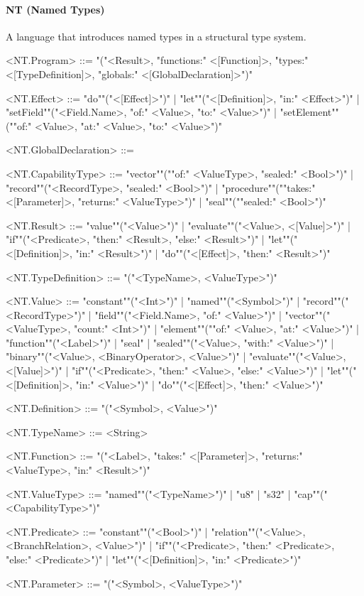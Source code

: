 \documentclass[main.tex]{subfiles}
\begin{document}
\paragraph{ NT (Named Types) } A language that introduces named types in a structural type system.
\begin{grammar}
	\footnotesize
				<NT.Program> ::=
							"("<Result>, "functions:" <[Function]>, "types:" <[TypeDefinition]>, "globals:" <[GlobalDeclaration]>")"
				\par
				<NT.Effect> ::=
						"do""("<[Effect]>")"
						| "let""("<[Definition]>, "in:" <Effect>")"
						| "setField""("<Field.Name>, "of:" <Value>, "to:" <Value>")"
						| "setElement""(""of:" <Value>, "at:" <Value>, "to:" <Value>")"
				\par
				<NT.GlobalDeclaration> ::=
				\par
				<NT.CapabilityType> ::=
						"vector""(""of:" <ValueType>, "sealed:" <Bool>")"
						| "record""("<RecordType>, "sealed:" <Bool>")"
						| "procedure""(""takes:" <[Parameter]>, "returns:" <ValueType>")"
						| "seal""(""sealed:" <Bool>")"
				\par
				<NT.Result> ::=
						"value""("<Value>")"
						| "evaluate""("<Value>, <[Value]>")"
						| "if""("<Predicate>, "then:" <Result>, "else:" <Result>")"
						| "let""("<[Definition]>, "in:" <Result>")"
						| "do""("<[Effect]>, "then:" <Result>")"
				\par
				<NT.TypeDefinition> ::=
							"("<TypeName>, <ValueType>")"
				\par
				<NT.Value> ::=
						"constant""("<Int>")"
						| "named""("<Symbol>")"
						| "record""("<RecordType>")"
						| "field""("<Field.Name>, "of:" <Value>")"
						| "vector""("<ValueType>, "count:" <Int>")"
						| "element""(""of:" <Value>, "at:" <Value>")"
						| "function""("<Label>")"
						| "seal"
						| "sealed""("<Value>, "with:" <Value>")"
						| "binary""("<Value>, <BinaryOperator>, <Value>")"
						| "evaluate""("<Value>, <[Value]>")"
						| "if""("<Predicate>, "then:" <Value>, "else:" <Value>")"
						| "let""("<[Definition]>, "in:" <Value>")"
						| "do""("<[Effect]>, "then:" <Value>")"
				\par
				<NT.Definition> ::=
							"("<Symbol>, <Value>")"
				\par
				<NT.TypeName> ::=
						<String>
				\par
				<NT.Function> ::=
							"("<Label>, "takes:" <[Parameter]>, "returns:" <ValueType>, "in:" <Result>")"
				\par
				<NT.ValueType> ::=
						"named""("<TypeName>")"
						| "u8"
						| "s32"
						| "cap""("<CapabilityType>")"
				\par
				<NT.Predicate> ::=
						"constant""("<Bool>")"
						| "relation""("<Value>, <BranchRelation>, <Value>")"
						| "if""("<Predicate>, "then:" <Predicate>, "else:" <Predicate>")"
						| "let""("<[Definition]>, "in:" <Predicate>")"
				\par
				<NT.Parameter> ::=
							"("<Symbol>, <ValueType>")"
				\par
\end{grammar}
\par
\end{document}
